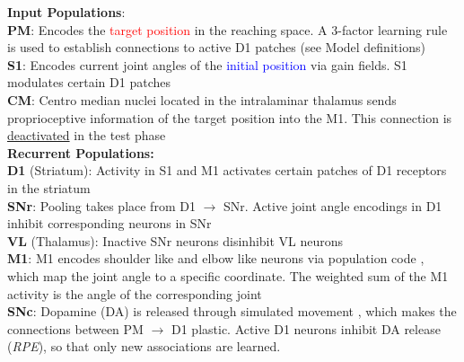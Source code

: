 \footnotesize
\justifying
\textbf{\textcolor{training-set}{Input Populations}}:\\[2pt]
\textbf{PM}: Encodes the \textcolor{red}{target position} in the reaching space. A 3-factor learning rule is used to establish connections to active D1 patches (see Model definitions)\\[2pt]
\textbf{S1}: Encodes current joint angles of the \textcolor{blue}{initial position} via gain fields. S1 modulates certain D1 patches \parencite{flahertyCorticostriatalTransformationsPrimate1991}\\[2pt]
\textbf{CM}: Centro median nuclei located in the intralaminar thalamus sends proprioceptive information of the target position into the M1. This connection is \underline{deactivated} in the test phase\\[10pt]
\textbf{Recurrent Populations:}\\[2pt]
\footnotesize
\textbf{D1} (Striatum): Activity in S1 and M1 activates certain patches of D1 receptors in the striatum\\[2pt]
\textbf{SNr}: Pooling takes place from D1 $\rightarrow$ SNr. Active joint angle encodings in D1 inhibit corresponding neurons in SNr\\[2pt]
\textbf{VL} (Thalamus): Inactive SNr neurons disinhibit VL neurons\\[2pt]
\textbf{M1}: M1 encodes shoulder like and elbow like neurons via population code 
\parencite{pruszynskiPrimaryMotorCortex2011}, which map the joint angle to a specific coordinate. The weighted sum of the M1 activity is the angle of the corresponding joint\\[2pt]
\textbf{SNc}: Dopamine (DA) is released through simulated movement \parencite{cheungLearningCriticallyDrives2023}, which makes the connections between PM $\rightarrow$ D1 plastic. Active D1 neurons inhibit DA release (\textit{RPE}), so that only new associations are learned.